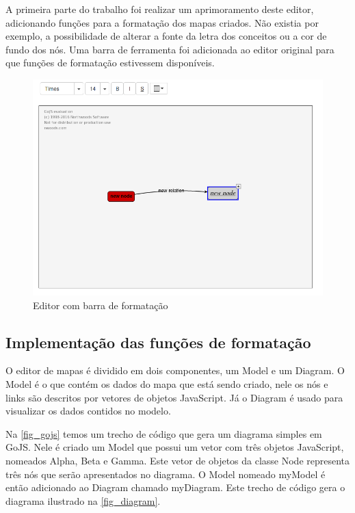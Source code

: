 \documentclass[
	12pt,				%
	openright,			%
	oneside,			%
	a4paper,			%
	english,			%
	french,				%
	spanish,			%
	brazil				%
	]{abntex2}
\begin{document}
A primeira parte do trabalho foi realizar um aprimoramento deste editor, adicionando funções para a formatação dos mapas criados. Não existia por exemplo, a possibilidade de alterar a fonte da letra dos conceitos ou a cor de fundo dos nós. Uma barra de ferramenta foi adicionada ao editor original para que funções de formatação estivessem disponíveis.

\begin{figure}[htb]
	\caption{\label{fig_barraformacao} Editor com barra de formatação}
	\begin{center}
		\includegraphics[scale=0.5]{barraformacao.png}
	\end{center}
\end{figure}

\subsection{Implementação das funções de formatação}
O editor de mapas é dividido em dois componentes, um Model e um Diagram. O Model é o que contém os dados do mapa que está sendo criado, nele os nós e links são descritos por vetores de objetos JavaScript. Já o Diagram é usado para visualizar os dados contidos no modelo.

Na \autoref{fig_gojs} temos um trecho de código que gera um diagrama simples em GoJS. Nele é criado um Model que possui um vetor com três objetos JavaScript, nomeados Alpha, Beta e Gamma. Este vetor de objetos da classe Node representa três nós que serão apresentados no diagrama. O Model nomeado myModel é então adicionado ao Diagram chamado myDiagram. Este trecho de código gera o diagrama ilustrado na \autoref{fig_diagram}.
\end{document}
